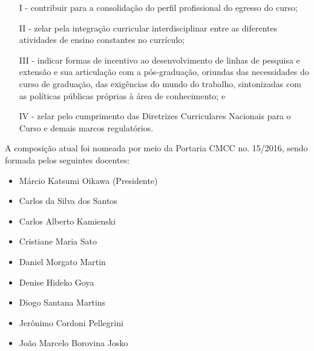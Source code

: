 \begin{enumerate}
	\item [I -] contribuir para a consolidação do perfil profissional do egresso do curso;
	\item [II -] zelar pela integração curricular interdisciplinar entre as diferentes atividades de ensino
	constantes no currículo;
	\item [III -] indicar formas de incentivo ao desenvolvimento de linhas de pesquisa e extensão e sua
	articulação com a pós-graduação, oriundas das necessidades do curso de graduação, das
	exigências do mundo do trabalho, sintonizadas com as políticas públicas próprias à área de
	conhecimento; e
	\item [IV -] zelar pelo cumprimento das Diretrizes Curriculares Nacionais para o Curso e demais
	marcos regulatórios.
\end{enumerate}

A composição atual foi nomeada por meio da Portaria CMCC no. 15/2016, sendo formada 
pelos seguintes docentes:

\begin{itemize}
	\item Márcio Katsumi Oikawa (Presidente)
	\item Carlos da Silva dos Santos
	\item Carlos Alberto Kamienski
	\item Cristiane Maria Sato
	\item Daniel Morgato Martin
	\item Denise Hideko Goya
	\item Diogo Santana Martins
	\item Jerônimo Cordoni Pellegrini
	\item João Marcelo Borovina Josko
\end{itemize}
